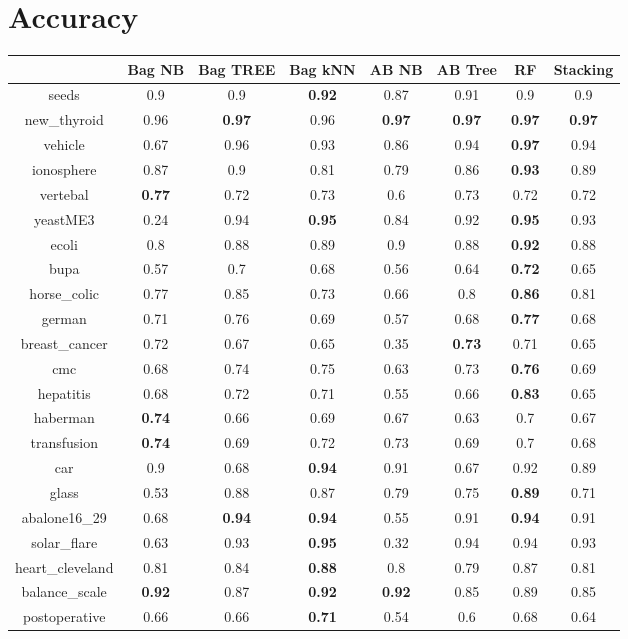 \documentclass{article}%
\begin{document}
%
\normalsize%
\section*{Accuracy}%
\begin{tabular}{c|ccccccc}%
&Bag NB&Bag TREE&Bag kNN&AB NB&AB Tree&RF&Stacking\\%
\hline%
seeds&0.9&0.9&\textbf{0.92}&0.87&0.91&0.9&0.9\\%
new\_thyroid&0.96&\textbf{0.97}&0.96&\textbf{0.97}&\textbf{0.97}&\textbf{0.97}&\textbf{0.97}\\%
vehicle&0.67&0.96&0.93&0.86&0.94&\textbf{0.97}&0.94\\%
ionosphere&0.87&0.9&0.81&0.79&0.86&\textbf{0.93}&0.89\\%
vertebal&\textbf{0.77}&0.72&0.73&0.6&0.73&0.72&0.72\\%
yeastME3&0.24&0.94&\textbf{0.95}&0.84&0.92&\textbf{0.95}&0.93\\%
ecoli&0.8&0.88&0.89&0.9&0.88&\textbf{0.92}&0.88\\%
bupa&0.57&0.7&0.68&0.56&0.64&\textbf{0.72}&0.65\\%
horse\_colic&0.77&0.85&0.73&0.66&0.8&\textbf{0.86}&0.81\\%
german&0.71&0.76&0.69&0.57&0.68&\textbf{0.77}&0.68\\%
breast\_cancer&0.72&0.67&0.65&0.35&\textbf{0.73}&0.71&0.65\\%
cmc&0.68&0.74&0.75&0.63&0.73&\textbf{0.76}&0.69\\%
hepatitis&0.68&0.72&0.71&0.55&0.66&\textbf{0.83}&0.65\\%
haberman&\textbf{0.74}&0.66&0.69&0.67&0.63&0.7&0.67\\%
transfusion&\textbf{0.74}&0.69&0.72&0.73&0.69&0.7&0.68\\%
car&0.9&0.68&\textbf{0.94}&0.91&0.67&0.92&0.89\\%
glass&0.53&0.88&0.87&0.79&0.75&\textbf{0.89}&0.71\\%
abalone16\_29&0.68&\textbf{0.94}&\textbf{0.94}&0.55&0.91&\textbf{0.94}&0.91\\%
solar\_flare&0.63&0.93&\textbf{0.95}&0.32&0.94&0.94&0.93\\%
heart\_cleveland&0.81&0.84&\textbf{0.88}&0.8&0.79&0.87&0.81\\%
balance\_scale&\textbf{0.92}&0.87&\textbf{0.92}&\textbf{0.92}&0.85&0.89&0.85\\%
postoperative&0.66&0.66&\textbf{0.71}&0.54&0.6&0.68&0.64\\%
\end{tabular}
\end{document}
